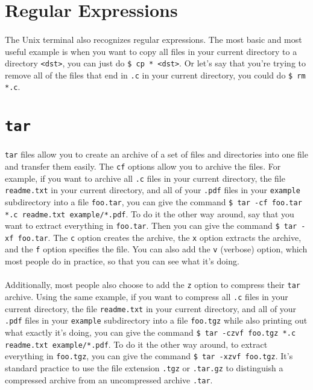 \documentclass{article}
\begin{document}
\section{Regular Expressions}

\paragraph{} The Unix terminal also recognizes regular expressions. The most basic and most useful example is when you want to copy all files in your current directory to a directory \texttt{<dst>}, you can just do \texttt{\$ cp * <dst>}. Or let's say that you're trying to remove all of the files that end in \texttt{.c} in your current directory, you could do \texttt{\$ rm *.c}.

\section{\texttt{tar}}

\paragraph{} \texttt{tar} files allow you to create an archive of a set of files and directories into one file and transfer them easily. The \texttt{cf} options allow you to archive the files. For example, if you want to archive all \texttt{.c} files in your current directory, the file \texttt{readme.txt} in your current directory, and all of your \texttt{.pdf} files in your \texttt{example} subdirectory into a file \texttt{foo.tar}, you can give the command \texttt{\$ tar -cf foo.tar *.c readme.txt example/*.pdf}. To do it the other way around, say that you want to extract everything in \texttt{foo.tar}. Then you can give the command \texttt{\$ tar -xf foo.tar}. The \texttt{c} option creates the archive, the \texttt{x} option extracts the archive, and the \texttt{f} option specifies the file. You can also add the \texttt{v} (verbose) option, which most people do in practice, so that you can see what it's doing.

\paragraph{} Additionally, most people also choose to add the \texttt{z} option to compress their \texttt{tar} archive. Using the same example, if you want to compress all \texttt{.c} files in your current directory, the file \texttt{readme.txt} in your current directory, and all of your \texttt{.pdf} files in your \texttt{example} subdirectory into a file \texttt{foo.tgz} while also printing out what exactly it's doing, you can give the command \texttt{\$ tar -czvf foo.tgz *.c readme.txt example/*.pdf}. To do it the other way around, to extract everything in \texttt{foo.tgz}, you can give the command \texttt{\$ tar -xzvf foo.tgz}. It's standard practice to use the file extension \texttt{.tgz} or \texttt{.tar.gz} to distinguish a compressed archive from an uncompressed archive \texttt{.tar}.
\end{document}
